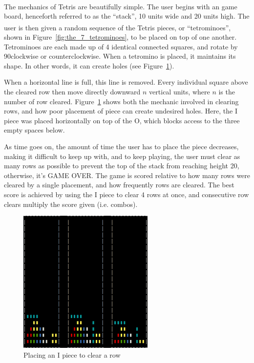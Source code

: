 \documentclass[ fontsize=11pt]{article}
\def\tetris{Tetris\textsuperscript{\textregistered}}
\begin{document}
\par The mechanics of \tetris{} are beautifully simple. The user begins with an game board, henceforth referred to as the ``stack'', 10 units wide and 20 units high. The user is then given a random sequence of the \tetris{} pieces, or ``tetrominoes'', shown in Figure~\ref{fig:the_7_tetrominoes}, to be placed on top of one another. Tetrominoes are each made up of 4 identical connected squares, and rotate by 90\textdegree clockwise or counterclockwise. When a tetromino is placed, it maintains its shape. In other words, it can create holes (see Figure~\ref{fig:placing_an_i_piece_to_clear_a_row}).
\par When a horizontal line is full, this line is removed. Every individual square above the cleared row then move directly downward $n$ vertical units, where $n$ is the number of row cleared. Figure~\ref{fig:placing_an_i_piece_to_clear_a_row} shows both the mechanic involved in clearing rows, and how poor placement of piece can create undesired holes. Here, the I piece was placed horizontally on top of the O, which blocks access to the three empty spaces below.
\par As time goes on, the amount of time the user has to place the piece decreases, making it difficult to keep up with, and to keep playing, the user must clear as many rows as possible to prevent the top of the stack from reaching height 20, otherwise, it's GAME OVER. The game is scored relative to how many rows were cleared by a single placement, and how frequently rows are cleared. The best score is achieved by using the I piece to clear 4 rows at once, and consecutive row clears multiply the score given (i.e. combos).

\begin{figure}[h!]
  \centering
  \includegraphics[width=0.6\textwidth, height=0.4\textwidth]{figures/rowclear-crop}
  \caption{Placing an I piece to clear a row}
  \label{fig:placing_an_i_piece_to_clear_a_row}
\end{figure}
\end{document}
